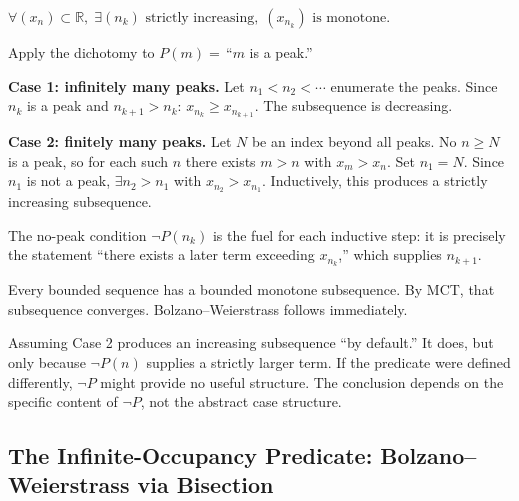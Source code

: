 \begin{remark}
$\forall(x_n)\subset\mathbb{R},\;
\exists(n_k)\text{ strictly increasing},\;(x_{n_k})\text{ is monotone}$.
\end{remark}

\begin{remark}
Apply the dichotomy to $P(m)=\,$``$m$ is a peak.''

\medskip
\noindent\textbf{Case 1: infinitely many peaks.}
Let $n_1<n_2<\cdots$ enumerate the peaks. Since $n_k$ is a peak and
$n_{k+1}>n_k$: $x_{n_k}\geq x_{n_{k+1}}$. The subsequence is decreasing.

\medskip
\noindent\textbf{Case 2: finitely many peaks.}
Let $N$ be an index beyond all peaks. No $n\geq N$ is a peak, so for each
such $n$ there exists $m>n$ with $x_m>x_n$. Set $n_1=N$. Since $n_1$ is
not a peak, $\exists n_2>n_1$ with $x_{n_2}>x_{n_1}$. Inductively, this
produces a strictly increasing subsequence.

\medskip
The no-peak condition $\neg P(n_k)$ is the fuel for each inductive step:
it is precisely the statement ``there exists a later term exceeding
$x_{n_k}$,'' which supplies $n_{k+1}$.
\end{remark}

\begin{remark}
Every bounded sequence has a bounded monotone subsequence. By MCT, that
subsequence converges. Bolzano--Weierstrass follows immediately.
\end{remark}

\begin{remark}
Assuming Case 2 produces an increasing subsequence ``by default.'' It does,
but only because $\neg P(n)$ supplies a strictly larger term. If the
predicate were defined differently, $\neg P$ might provide no useful
structure. The conclusion depends on the specific content of $\neg P$,
not the abstract case structure.
\end{remark}



\subsection*{The Infinite-Occupancy Predicate: Bolzano--Weierstrass via Bisection}
\label{subsec:bw-bisection}

